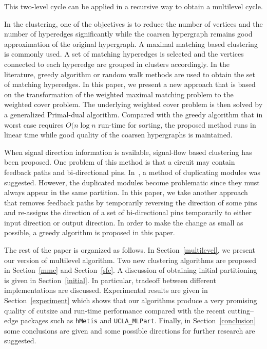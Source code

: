 \documentclass[journal]{IEEEtran}
\begin{document}
This two-level cycle can be applied in a recursive way to obtain
a multilevel cycle. 

In the clustering, one of the objectives is to reduce the number of
vertices and the number of hyperedges significantly while the coarsen
hypergraph remains good approximation of the original hypergraph. A
maximal matching based clustering is commonly used.
A set of matching hyperedges is selected and the vertices connected to 
each hyperedge are grouped in clusters accordingly. In the
literature, greedy algorithm or random walk methods are used to
obtain the set of matching hyperedges. In this paper, we present a new
approach that is based on the transformation of the weighted maximal
matching problem to the weighted cover problem. The underlying weighted
cover problem is then solved by a generalized Primal-dual algorithm. 
Compared with the greedy algorithm that in worst case requires 
$O(n \log n$ run-time for sorting, the proposed method runs in
linear time while good quality of the coarsen hypergraphs is maintained.
 
When signal direction information is available, signal-flow based
clustering has been proposed. One problem of this method is that a
circuit may contain feedback paths and bi-directional
pins. In~\cite{ispd_benchmark_1998}, a method of duplicating modules was
suggested. However, the duplicated modules become problematic since
they must always appear in the same partition. In this paper, we
take another approach that removes feedback paths by temporarily
reversing the direction of some pins and re-assigns the direction of a
set of bi-directional pins temporarily to either input direction or output
direction. In order to make the change as small as possible, a greedy
algorithm is proposed in this paper.


The rest of the paper is organized as follows. In
Section~\ref{multilevel}, we present our version of multilevel
algorithm. Two new clustering algorithms are proposed in
Section~\ref{mmc} and Section~\ref{sfc}. A discussion of
obtaining initial partitioning is given in Section~\ref{initial}.
In particular, tradeoff between different implementations are discussed. 
Experimental results are given in Section~\ref{experiment} which shows
that our algorithms produce a very promising quality of cutsize and
run-time performance compared with the recent cutting--edge packages
such as \verb+hMetis+ and \verb+UCLA_MLPart+.
Finally, in Section~\ref{conclusion} some conclusions are
given and some possible directions for further research are suggested.
\end{document}
